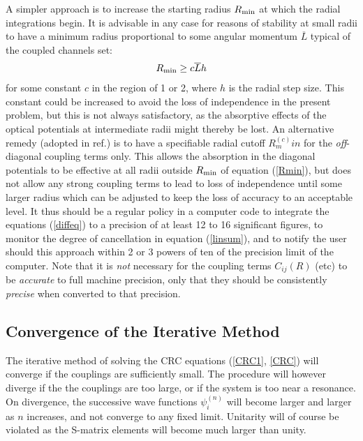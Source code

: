 \documentclass[11pt,a4paper]{article}
\begin{document}
A simpler approach is to increase the starting radius $R_{\rm min}$
at which the radial integrations begin. It is advisable in any case for
reasons of stability at small radii to have a minimum radius proportional to
some angular momentum $\overline L $ typical of the coupled channels set:
\begin{eqnarray} \label{Rmin}
    R_{\rm min} \geq c \overline L h
\end{eqnarray}
for some constant $c$ in the region of 1 or 2, where $h$ is the radial
step size.  This constant could be increased to avoid the loss of
independence in the present problem, but this is not always satisfactory,
as the absorptive effects of the optical potentials at intermediate radii
might thereby be lost.  An alternative remedy
(adopted in ref.\cite{FRESCO}) is to have a specifiable radial
cutoff $R^(c)_min$ for the {\em off}-diagonal coupling
terms only. This allows the absorption in the diagonal potentials to be
effective at all radii outside $R_{\rm min}$ of equation (\ref{Rmin}),
but does not allow any strong coupling terms to lead to loss of
independence until some larger radius which can be adjusted to keep the
loss of accuracy to an acceptable level. It thus should be a regular
policy in a computer code to integrate the equations (\ref{diffeq}) to a
precision of at least 12 to 16 significant figures, to
monitor the degree of cancellation in equation (\ref{linsum}),
and to notify the user should this approach within 2 or
3 powers of ten of the precision limit of the computer.
Note that it is {\em not} necessary for the coupling terms
$ C_{ij} (R) $ (etc)
to be {\em accurate} to full machine precision, only that they should
be consistently {\em precise} when converted to that precision.
\subsection{Convergence of the Iterative Method}

The iterative method of solving the CRC equations (\ref{CRC1}, \ref{CRC})
will converge if the couplings are sufficiently small.
The procedure will however diverge if the the couplings are too large, or if
the system is too near a resonance.
On divergence, the successive wave functions $\psi_i^{(n)}$
will become larger and larger as $n$ increases, and not converge to
any fixed limit. Unitarity will of course be violated as the S-matrix
elements will become much larger than unity.
\end{document}
